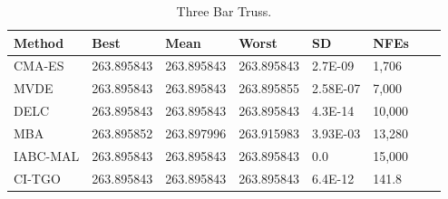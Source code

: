 
\begin{table*}[tp]
    \tiny
\begin{center}

\begin{tabular}{ P{2.0cm} P{2.0cm} P{2.0cm} P{2.0cm} P{2.0cm} P{2.0cm} P{2.0cm} P{2.0cm}  }
\hline
\textbf{Method} & \textbf{Best} & \textbf{Mean} & \textbf{Worst} & \textbf{SD} & \textbf{NFEs} \\
\hline

CMA-ES & 263.895843 & 263.895843 & 263.895843 & 2.7E-09 & 1,706 \\
MVDE & 263.895843 & 263.895843 & 263.895855 & 2.58E-07 & 7,000 \\
DELC & 263.895843 & 263.895843 & 263.895843 & 4.3E-14 & 10,000 \\
MBA & 263.895852 & 263.897996 & 263.915983 & 3.93E-03 & 13,280 \\
IABC-MAL & 263.895843 & 263.895843 & 263.895843 & 0.0 & 15,000 \\
CI-TGO & 263.895843 & 263.895843 & 263.895843 & 6.4E-12 & 141.8 \\


\hline
\end{tabular}
\end{center}

\caption{ Three Bar Truss. \\[1em]}
\label{tab:TB}
\end{table*}

